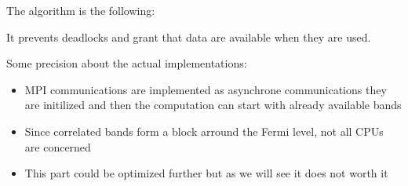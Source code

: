 \begin{frame}[fragile]
  The algorithm is the following:
  \begin{algorithm}[H]
  \end{algorithm}
  It prevents deadlocks and grant that data are available when they are used.
\end{frame}

\begin{frame}
  Some precision about the actual implementations:
  \begin{itemize}
    \item MPI communications are implemented as asynchrone communications they are
      initilized and then the computation can start with already available bands
    \item Since correlated bands form a block arround the Fermi level, not all CPUs
      are concerned
    \item This part could be optimized further but as we will see it does not worth it

  \end{itemize}
\end{frame}
